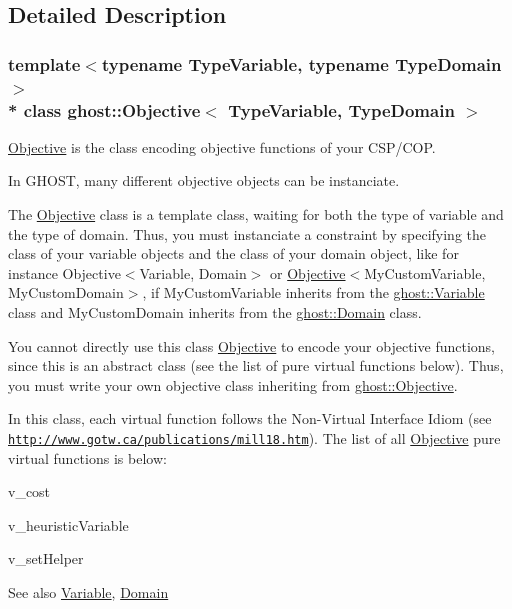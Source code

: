 \subsection{Detailed Description}
\subsubsection*{template$<$typename Type\+Variable, typename Type\+Domain$>$\\*
class ghost\+::\+Objective$<$ Type\+Variable, Type\+Domain $>$}

\hyperlink{classghost_1_1Objective}{Objective} is the class encoding objective functions of your C\+S\+P/\+C\+OP. 

In G\+H\+O\+ST, many different objective objects can be instanciate.

The \hyperlink{classghost_1_1Objective}{Objective} class is a template class, waiting for both the type of variable and the type of domain. Thus, you must instanciate a constraint by specifying the class of your variable objects and the class of your domain object, like for instance Objective$<$\+Variable, Domain$>$ or \hyperlink{classghost_1_1Objective}{Objective}$<$My\+Custom\+Variable, My\+Custom\+Domain$>$, if My\+Custom\+Variable inherits from the \hyperlink{classghost_1_1Variable}{ghost\+::\+Variable} class and My\+Custom\+Domain inherits from the \hyperlink{classghost_1_1Domain}{ghost\+::\+Domain} class.

You cannot directly use this class \hyperlink{classghost_1_1Objective}{Objective} to encode your objective functions, since this is an abstract class (see the list of pure virtual functions below). Thus, you must write your own objective class inheriting from \hyperlink{classghost_1_1Objective}{ghost\+::\+Objective}.

In this class, each virtual function follows the Non-\/\+Virtual Interface Idiom (see \href{http://www.gotw.ca/publications/mill18.htm}{\tt http\+://www.\+gotw.\+ca/publications/mill18.\+htm}). The list of all \hyperlink{classghost_1_1Objective}{Objective} pure virtual functions is below\+:
\begin{DoxyItemize}
\item v\+\_\+cost
\item v\+\_\+heuristic\+Variable
\item v\+\_\+set\+Helper
\end{DoxyItemize}

\begin{DoxySeeAlso}{See also}
\hyperlink{classghost_1_1Variable}{Variable}, \hyperlink{classghost_1_1Domain}{Domain} 
\end{DoxySeeAlso}


